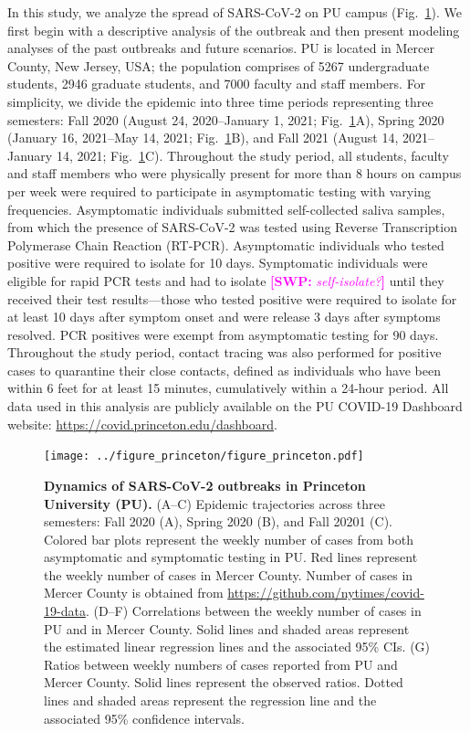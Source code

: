 \documentclass[12pt]{article}
\newcommand{\fref}[1]{Fig.~\ref{fig:#1}}
\newcommand{\comment}[3]{\textcolor{#1}{\textbf{[#2: }\textsl{#3}\textbf{]}}}
\newcommand{\swp}[1]{\comment{magenta}{SWP}{#1}}
\begin{document}
In this study, we analyze the spread of SARS-CoV-2 on PU campus (\fref{princeton}).
We first begin with a descriptive analysis of the outbreak and then present modeling analyses of the past outbreaks and future scenarios.
PU is located in Mercer County, New Jersey, USA;
the population comprises of 5267 undergraduate students, 2946 graduate students, and 7000 faculty and staff members.
For simplicity, we divide the epidemic into three time periods representing three semesters: Fall 2020 (August 24, 2020--January 1, 2021; \fref{princeton}A), Spring 2020 (January 16, 2021--May 14, 2021; \fref{princeton}B), and Fall 2021 (August 14, 2021--January 14, 2021; \fref{princeton}C).
Throughout the study period, all students, faculty and staff members who were physically present for more than 8 hours on campus per week were required to participate in asymptomatic testing with varying frequencies.
Asymptomatic individuals submitted self-collected saliva samples, from which the presence of SARS-CoV-2 was tested using Reverse Transcription Polymerase Chain Reaction (RT-PCR).  
Asymptomatic individuals who tested positive were required to isolate for 10 days.
Symptomatic individuals were eligible for rapid PCR tests and had to isolate \swp{self-isolate?} until they received their test results---those who tested positive were required to isolate for at least 10 days after symptom onset and were release 3 days after symptoms resolved.
PCR positives were exempt from asymptomatic testing for 90 days.
Throughout the study period, contact tracing was also performed for positive cases to quarantine their close contacts, defined as individuals who have been within 6 feet for at least 15 minutes, cumulatively within a 24-hour period.
All data used in this analysis are publicly available on the PU COVID-19 Dashboard website: \url{https://covid.princeton.edu/dashboard}.


\begin{figure}[!th]
\texttt{[image: ../figure\_princeton/figure\_princeton.pdf]}
\caption{
\textbf{Dynamics of SARS-CoV-2 outbreaks in Princeton University (PU).}
(A--C) Epidemic trajectories across three semesters: Fall 2020 (A), Spring 2020 (B), and Fall 20201 (C).
Colored bar plots represent the weekly number of cases from both asymptomatic and symptomatic testing in PU.
Red lines represent the weekly number of cases in Mercer County.
Number of cases in Mercer County is obtained from \url{https://github.com/nytimes/covid-19-data}.
(D--F) Correlations between the weekly number of cases in PU and in Mercer County.
Solid lines and shaded areas represent the estimated linear regression lines and the associated 95\% CIs.
(G) Ratios between weekly numbers of cases reported from PU and Mercer County.
Solid lines represent the observed ratios.
Dotted lines and shaded areas represent the regression line and the associated 95\% confidence intervals.
\label{fig:princeton}
}
\end{figure}
\end{document}
